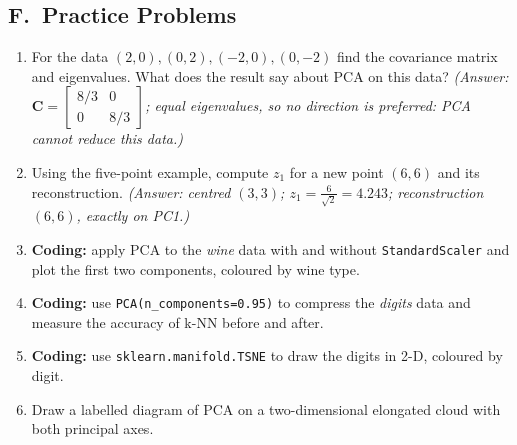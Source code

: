 \subsection*{F.\ Practice Problems}
\begin{enumerate}
  \item For the data $(2,0),(0,2),(-2,0),(0,-2)$ find the covariance matrix and eigenvalues. What does the result say about PCA on this data? \textit{(Answer: $\mathbf C=\begin{bmatrix}8/3&0\\0&8/3\end{bmatrix}$; equal eigenvalues, so no direction is preferred: PCA cannot reduce this data.)}
  \item Using the five-point example, compute $z_1$ for a new point $(6,6)$ and its reconstruction. \textit{(Answer: centred $(3,3)$; $z_1=\frac{6}{\sqrt2}=4.243$; reconstruction $(6,6)$, exactly on PC1.)}
  \item \textbf{Coding:} apply PCA to the \emph{wine} data with and without \texttt{StandardScaler} and plot the first two components, coloured by wine type.
  \item \textbf{Coding:} use \texttt{PCA(n\_components=0.95)} to compress the \emph{digits} data and measure the accuracy of k-NN before and after.
  \item \textbf{Coding:} use \texttt{sklearn.manifold.TSNE} to draw the digits in 2-D, coloured by digit.
  \item Draw a labelled diagram of PCA on a two-dimensional elongated cloud with both principal axes.
\end{enumerate}

